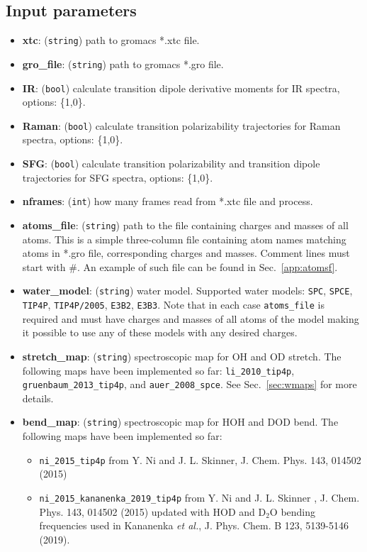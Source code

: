 \documentclass{article}
\begin{document}
\subsection{Input parameters}

\begin{itemize}

\item \textbf{xtc}: (\texttt{string}) path to gromacs *.xtc file.
\item \textbf{gro\_file}: (\texttt{string}) path to gromacs *.gro file.
\item \textbf{IR}: (\texttt{bool}) calculate transition dipole derivative moments for IR spectra, options: \{1,0\}.
\item \textbf{Raman}: (\texttt{bool}) calculate transition polarizability trajectories for Raman spectra, options: \{1,0\}.
\item \textbf{SFG}: (\texttt{bool}) calculate transition polarizability and transition dipole trajectories for SFG spectra, options: \{1,0\}.
\item \textbf{nframes}: (\texttt{int}) how many frames read from *.xtc file and process.
\item \textbf{atoms\_file}: (\texttt{string}) path to the file containing charges and masses of all atoms. This is a simple three-column file containing atom names matching atoms in 
*.gro file, corresponding charges and masses. Comment lines must start with \textsc{\#}. An example of such file can be found in Sec.~\ref{app:atomsf}.
\item \textbf{water\_model}: (\texttt{string}) water model. Supported water models: \texttt{SPC}, \texttt{SPCE}, \texttt{TIP4P}, \texttt{TIP4P/2005}, \texttt{E3B2}, \texttt{E3B3}.
Note that in each case \texttt{atoms\_file} is required and must have charges and masses of all atoms of the model making it possible to use any of these models
with any desired charges.
\item \textbf{stretch\_map}: (\texttt{string}) spectroscopic map for OH and OD stretch. The following maps have been implemented so far:
 \texttt{li\_2010\_tip4p},  \texttt{gruenbaum\_2013\_tip4p}, and \texttt{auer\_2008\_spce}. See Sec.~\ref{sec:wmaps} for more details.

\item \textbf{bend\_map}: (\texttt{string}) spectroscopic map for HOH and DOD bend. 
The following maps have been implemented so far:
\begin{itemize}
\item \texttt{ni\_2015\_tip4p} from Y. Ni and J. L. Skinner, J. Chem. Phys. 143, 014502 (2015)
\item  \texttt{ni\_2015\_kananenka\_2019\_tip4p} from Y. Ni and J. L. Skinner , J. Chem. Phys. 143, 014502 (2015) updated with HOD and D$_2$O 
bending frequencies used in Kananenka \textit{et al.}, J. Phys. Chem. B 123, 5139-5146 (2019).
\end{itemize}



\end{itemize}
\end{document}
